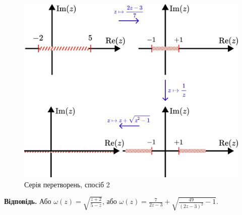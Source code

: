 \documentclass[oneside,solution]{karazin-complan-assign}
\begin{document}
\begin{figure}
    \centering
    \includegraphics[width=\textwidth]{images/hw_5/problem_3(2).pdf}
    \caption{Серія перетворень, спосіб 2}
    \label{fig:3(2)}
\end{figure}

\textbf{Відповідь.} Або $\omega(z) = \sqrt{\frac{z+2}{5-z}}$, або $\omega(z) = \frac{7}{2z-3} + \sqrt{\frac{49}{(2z-3)^2}-1}$.
\end{document}
